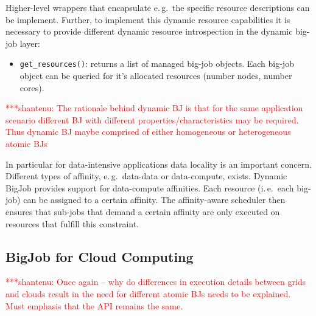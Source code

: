 \documentclass[conference,final]{IEEEtran}
\newcommand{\jhanote}[1]{ {\textcolor{red} { ***shantenu: #1 }}}
\newcommand{\jhanote}[1]{}
\begin{document}
Higher-level wrappers that encapsulate e.\,g.\ the specific resource
descriptions can be implement. Further, to implement this dynamic resource
capabilities it is necessary to provide different dynamic resource introspection
in the dynamic big-job layer:
\begin{itemize}
    \item \texttt{get\_resources()}: returns a list of managed big-job objects.
     Each big-job object can be queried for it's allocated resources (number 
     nodes, number cores).
\end{itemize}



\jhanote{The rationale behind dynamic BJ is that for the same
  application scenario different BJ with different
  properties/characteristics may be required. Thus dynamic BJ maybe
  comprised of either homogeneous or heterogeneous atomic BJs}

In particular for data-intensive applications data locality is an important
concern. Different types of affinity, e.\,g.\ data-data or data-compute, exists.
Dynamic BigJob provides support for data-compute affinities. Each resource
(i.\,e.\ each big-job) can be assigned to a certain affinity. The affinity-aware
scheduler then ensures that sub-jobs that demand a certain affinity are only
executed on resources that fulfill this constraint.



\subsection{BigJob for Cloud Computing}

\jhanote{Once again -- why do differences in execution details between
  grids and clouds result in the need for different atomic BJs needs
  to be explained. Must emphasis that the API remains the same.}
\end{document}
